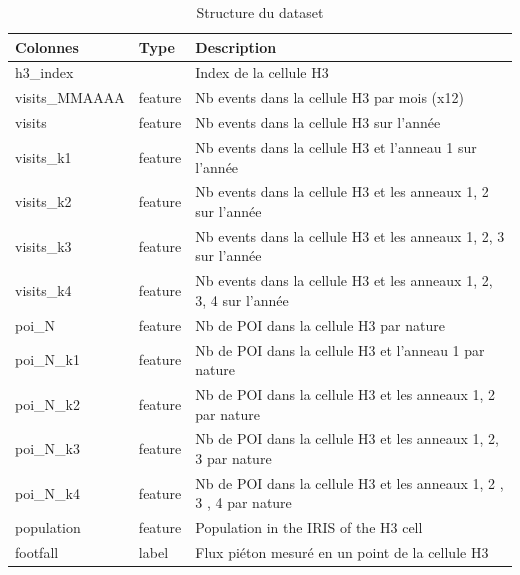 \begin{table}[H]
    \centering
    \begin{tabular}{|l|l|l|}
    \hline
    \textbf{Colonnes}    & \textbf{Type} & \textbf{Description}                                                    \\ \hline
    h3\_index            &               & Index de la cellule H3                                                  \\ \hline
    visits\_MMAAAA & feature       & Nb events dans la cellule H3 par mois (x12)                        \\ \hline
    visits        & feature       & Nb events dans la cellule H3 sur l'année                          \\ \hline
    visits\_k1     & feature       & Nb events dans la cellule H3 et l'anneau 1 sur l'année            \\ \hline
    visits\_k2     & feature       & Nb events dans la cellule H3 et les anneaux 1, 2 sur l'année       \\ \hline
    visits\_k3     & feature       & Nb events dans la cellule H3 et les anneaux 1, 2, 3 sur l'année    \\ \hline
    visits\_k4     & feature       & Nb events dans la cellule H3 et les anneaux 1, 2, 3, 4 sur l'année \\ \hline
    poi\_N        & feature       & Nb de POI dans la cellule H3 par nature                                 \\ \hline
    poi\_N\_k1    & feature       & Nb de POI dans la cellule H3 et l'anneau 1 par nature                   \\ \hline
    poi\_N\_k2    & feature       & Nb de POI dans la cellule H3 et les anneaux 1, 2 par nature              \\ \hline
    poi\_N\_k3    & feature       & Nb de POI dans la cellule H3 et les anneaux 1, 2, 3 par nature           \\ \hline
    poi\_N\_k4    & feature       & Nb de POI dans la cellule H3 et les anneaux 1, 2 , 3 , 4 par nature      \\ \hline
    population           & feature       & Population in the IRIS of the H3 cell                                   \\ \hline
    footfall             & label         & Flux piéton mesuré en un point de la cellule H3                         \\ \hline
    \end{tabular}
    \caption{Structure du dataset}
    \end{table}

